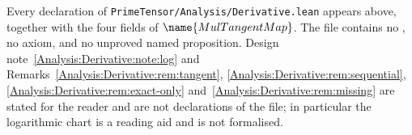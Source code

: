 \noindent
Every declaration of \texttt{PrimeTensor/Analysis/Derivative.lean} appears
above, together with the four fields of $\name{MulTangentMap}$.  The file
contains no , no axiom, and no unproved named proposition.
Design note~\ref{Analysis:Derivative:note:log} and
Remarks~\ref{Analysis:Derivative:rem:tangent},
\ref{Analysis:Derivative:rem:sequential},
\ref{Analysis:Derivative:rem:exact-only}
and~\ref{Analysis:Derivative:rem:missing} are stated for the reader and are not
declarations of the file; in particular the logarithmic chart is a reading aid
and is not formalised.
